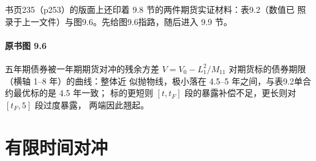 
书页235（p253）的版面上还印着 9.8 节的两件期货实证材料：表9.2（数值已
照录于上一文件）与图9.6。先给图9.6指路，随后进入 9.9 节。

\paragraph{原书图 9.6}\quad 五年期债券被一年期期货对冲的残余方差
$V=V_0-L_1^2/M_{11}$ 对期货标的债券期限（横轴 1--8 年）的曲线：整体近
似抛物线，极小落在 4.5--5 年之间，与表9.2单合约最优标的是 4.5 年一致；
标的更短则 $[t,t_F]$ 段的暴露补偿不足，更长则对 $[t_F,5]$ 段过度暴露，
两端因此翘起。

\section{有限时间对冲}

